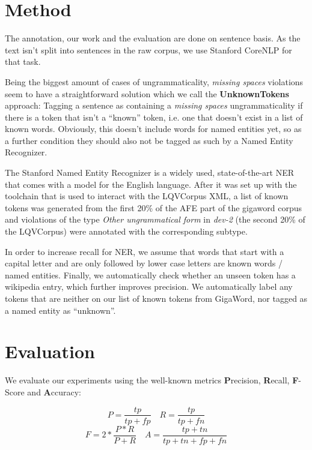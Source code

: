 \documentclass[a4paper,10pt]{scrartcl}
\begin{document}
\section{Method}

The annotation, our work and the evaluation are done on sentence basis. As the text isn't split into sentences in the raw corpus, we use Stanford CoreNLP for that task. %

Being the biggest amount of cases of ungrammaticality, \textit{missing spaces} violations seem to have a straightforward solution which we call the \textbf{UnknownTokens} approach: Tagging a sentence as containing a \textit{missing spaces} ungrammaticality if there is a token that isn't a ``known'' token, i.e. one that doesn't exist in a list of known words. Obviously, this doesn't include words for named entities yet, so as a further condition they should also not be tagged as such by a Named Entity Recognizer.

The Stanford Named Entity Recognizer \citep{stanfordNER} is a widely used, state-of-the-art NER that comes with a model for the English language. After it was set up with the toolchain that is used to interact with the LQVCorpus XML, a list of known tokens was generated from the first 20\% of the AFE part of the gigaword corpus \citep{gigaword} and violations of the type \textit{Other ungrammatical form} in \textit{dev-2} (the second 20\% of the LQVCorpus) were annotated with the corresponding subtype.

In order to increase recall for NER, we assume that words that start with a capital letter and are only followed by lower case letters are known words / named entities. Finally, we automatically check whether an unseen token has a wikipedia entry, which further improves precision. We automatically label any tokens that are neither on our list of known tokens from GigaWord, nor tagged as a named entity as ``unknown''. 

\section{Evaluation}

We evaluate our experiments using the well-known metrics \textbf{P}recision, \textbf{R}ecall, \textbf{F}-Score and \textbf{A}ccuracy:

\begin{equation*}
	P = \frac{tp}{tp+fp} \quad R = \frac{tp}{tp+fn}
\end{equation*}
\begin{equation*}
	F = 2 * \frac{P * R}{P + R} \quad A = \frac{tp+tn}{tp+tn+fp+fn}
\end{equation*}
\end{document}
